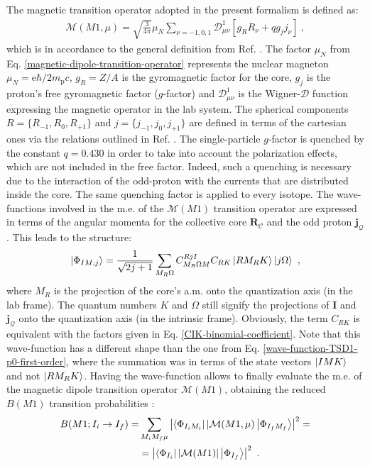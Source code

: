 The magnetic transition operator adopted in the present formalism is defined as:
\begin{align}
    \mathcal{M}(M1,\mu)=\sqrt{\frac{3}{4\pi}}\mu_N\sum_{\nu=-1,0,1}\mathcal{D}_{\mu\nu}^1\left[g_RR_\nu+qg_jj_\nu\right]\ ,
    \label{magnetic-dipole-transition-operator}
\end{align}
which is in accordance to the general definition from Ref. \cite{toki1975asymmetric}. The factor $\mu_N$ from Eq. \ref{magnetic-dipole-transition-operator} represents the nuclear magneton $\mu_N=\mathrm{e}\hbar/2m_\text{p}c$, $g_R=Z/A$ is the gyromagnetic factor for the core, $g_j$ is the proton's free gyromagnetic factor ($g$-factor) \cite{tiesinga2021codata} and $\mathcal{D}_{\mu\nu}^1$ is the Wigner-$\mathcal{D}$ function expressing the magnetic operator in the lab system. The spherical components $R=\{R_{-1},R_0,R_{+1}\}$ and $j=\{j_{-1},j_0,j_{+1}\}$ are defined in terms of the cartesian ones via the relations outlined in Ref. \cite{varshalovich1988quantum}. The single-particle $g$-factor is quenched by the constant $q=0.430$ in order to take into account the polarization effects, which are not included in the free factor. Indeed, such a quenching is necessary due to the interaction of the odd-proton with the currents that are distributed inside the core. The same quenching factor is applied to every isotope. The wave-functions involved in the m.e. of the $\mathcal{M}(M1)$ transition operator are expressed in terms of the angular momenta for the collective core $\mathbf{R}_\mathscr{C}$ and the odd proton $\mathbf{j}_\mathcal{Q}$. This leads to the structure:
\begin{align}
    \ket{\Phi_{IM;j}}=\frac{1}{\sqrt{2j+1}}\sum_{M_R\Omega}C_{M_R\Omega M}^{RjI}C_{RK}\ket{RM_RK}\ket{j\Omega}\ ,
    \label{wave-function-magnetic}
\end{align}
where $M_R$ is the projection of the core's a.m. onto the quantization axis (in the lab frame). The quantum numbers $K$ and $\Omega$ still signify the projections of $\mathbf{I}$ and $\mathbf{j}_\mathcal{Q}$ onto the quantization axis (in the intrinsic frame). Obviously, the term $C_{RK}$ is equivalent with the factors given in Eq. \ref{CIK-binomial-coefficient}. Note that this wave-function has a different shape than the one from Eq. \ref{wave-function-TSD1-p0-first-order}, where the summation was in terms of the state vectors $\ket{IMK}$ and not $\ket{RM_RK}$. Having the wave-function allows to finally evaluate the m.e. of the magnetic dipole transition operator $\mathcal{M}(M1)$, obtaining the reduced $B(M1)$ transition probabilities \cite{raduta2017semiclassical}:
\begin{align}
    B(M1;I_i\to I_f)=&\sum_{M_iM_f\mu}\left|\bra{\Phi_{I_iM_i}}|\mathcal{M}(M1,\mu)\ket{\Phi_{I_fM_f}}\right|^2=\nonumber\\
                     &=\left|\bra{\Phi_{I_i}}|\mathcal{M}(M1)|\ket{\Phi_{I_f}}\right|^2\ .
    \label{reduced-BM1-transition}
\end{align}


